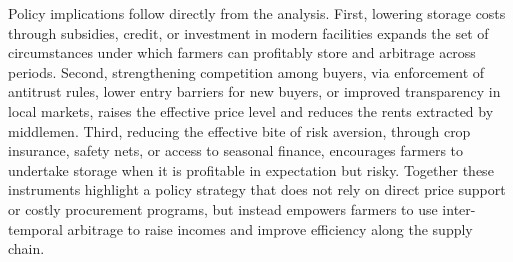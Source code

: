 Policy implications follow directly from the analysis. First, lowering storage costs through subsidies, credit, or investment in modern facilities expands the set of circumstances under which farmers can profitably store and arbitrage across periods. Second, strengthening competition among buyers, via enforcement of antitrust rules, lower entry barriers for new buyers, or improved transparency in local markets, raises the effective price level and reduces the rents extracted by middlemen. Third, reducing the effective bite of risk aversion, through crop insurance, safety nets, or access to seasonal finance, encourages farmers to undertake storage when it is profitable in expectation but risky. Together these instruments highlight a policy strategy that does not rely on direct price support or costly procurement programs, but instead empowers farmers to use inter-temporal arbitrage to raise incomes and improve efficiency along the supply chain.








